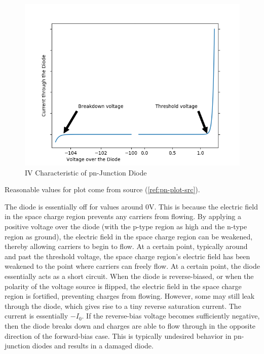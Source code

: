 \FloatBarrier

\begin{figure}[h!]
	\centering
	\includegraphics[scale=0.75]{../images/ideal_pn_diode.PNG}
	\caption{IV Characteristic of pn-Junction Diode}
	\label{fig:pn-junction_iv}
\end{figure}

{\footnotesize Reasonable values for plot come from source (\ref{ref:pn-plot-src}). }

\FloatBarrier

The diode is essentially off for values around 0V. This is because the electric field in the space charge region prevents any carriers from flowing. By applying a positive voltage over the diode (with the p-type region as high and the n-type region as ground), the electric field in the space charge region can be weakened, thereby allowing carriers to begin to flow. At a certain point, typically around and past the threshold voltage, the space charge region's electric field has been weakened to the point where carriers can freely flow. At a certain point, the diode essentially acts as a short circuit.
When the diode is reverse-biased, or when the polarity of the voltage source is flipped, the electric field in the space charge region is fortified, preventing charges from flowing. However, some may still leak through the diode, which gives rise to a tiny reverse saturation current. The current is essentially $-I_0$.
If the reverse-bias voltage becomes sufficiently negative, then the diode breaks down and charges are able to flow through in the opposite direction of the forward-bias case. This is typically undesired behavior in pn-junction diodes and results in a damaged diode.

